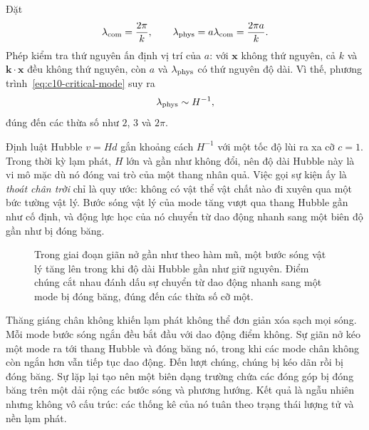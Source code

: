 Đặt
\[
\lambda_{\rm com}=\frac{2\pi}{k},
\qquad
\lambda_{\rm phys}=a\lambda_{\rm com}
=\frac{2\pi a}{k}.
\]
Phép kiểm tra thứ nguyên ấn định vị trí của \(a\): với \(\mathbf x\) không thứ nguyên, cả \(k\) và \(\mathbf k\cdot\mathbf x\) đều không thứ nguyên, còn \(a\) và \(\lambda_{\rm phys}\) có thứ nguyên độ dài. Vì thế, phương trình~\eqref{eq:c10-critical-mode} suy ra
\begin{equation}
\lambda_{\rm phys}\sim H^{-1},
\label{eq:c10-horizon-crossing}
\end{equation}
đúng đến các thừa số như \(2\), \(3\) và \(2\pi\).

Định luật Hubble \(v=Hd\) gắn khoảng cách \(H^{-1}\) với một tốc độ lùi ra xa cỡ \(c=1\). Trong thời kỳ lạm phát, \(H\) lớn và gần như không đổi, nên độ dài Hubble này là vi mô mặc dù nó đóng vai trò của một thang nhân quả. Việc gọi sự kiện ấy là \emph{thoát chân trời} chỉ là quy ước: không có vật thể vật chất nào đi xuyên qua một bức tường vật lý. Bước sóng vật lý của mode tăng vượt qua thang Hubble gần như cố định, và động lực học của nó chuyển từ dao động nhanh sang một biên độ gần như bị đóng băng.

\begin{figure}[htbp]
\centering
\begin{coursefitfigure}
\end{coursefitfigure}
\caption{Trong giai đoạn giãn nở gần như theo hàm mũ, một bước sóng vật lý tăng lên trong khi độ dài Hubble gần như giữ nguyên. Điểm chúng cắt nhau đánh dấu sự chuyển từ dao động nhanh sang một mode bị đóng băng, đúng đến các thừa số cỡ một.}
\label{fig:c10-horizon-reconstruction}
\end{figure}

Thăng giáng chân không khiến lạm phát không thể đơn giản xóa sạch mọi sóng. Mỗi mode bước sóng ngắn đều bắt đầu với dao động điểm không. Sự giãn nở kéo một mode ra tới thang Hubble và đóng băng nó, trong khi các mode chân không còn ngắn hơn vẫn tiếp tục dao động. Đến lượt chúng, chúng bị kéo dãn rồi bị đóng băng. Sự lặp lại tạo nên một biên dạng trường chứa các đóng góp bị đóng băng trên một dải rộng các bước sóng và phương hướng. Kết quả là ngẫu nhiên nhưng không vô cấu trúc: các thống kê của nó tuân theo trạng thái lượng tử và nền lạm phát.

